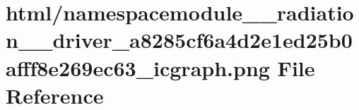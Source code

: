 \hypertarget{namespacemodule____radiation____driver__a8285cf6a4d2e1ed25b0afff8e269ec63__icgraph_8png}{}\section{html/namespacemodule\+\_\+\+\_\+radiation\+\_\+\+\_\+driver\+\_\+a8285cf6a4d2e1ed25b0afff8e269ec63\+\_\+icgraph.png File Reference}
\label{namespacemodule____radiation____driver__a8285cf6a4d2e1ed25b0afff8e269ec63__icgraph_8png}
